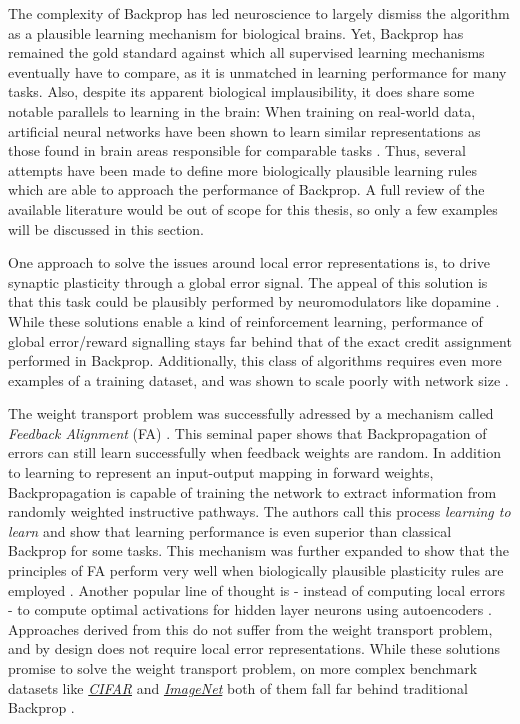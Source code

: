 The complexity of Backprop has led neuroscience to largely dismiss the algorithm as a plausible learning mechanism for
biological brains. Yet, Backprop has remained the gold standard against which all supervised learning mechanisms
eventually have to compare, as it is unmatched in learning performance for many tasks. Also, despite its apparent
biological implausibility, it does share some notable parallels to learning in the brain: When training on real-world
data, artificial neural networks have been shown to learn similar representations as those found in brain areas
responsible for comparable tasks \citep{McClelland1995,barone2000laminar,Yamins2016,Marblestone2016}. Thus, several
attempts have been made to define more biologically plausible learning rules which are able to approach the performance
of  Backprop. A full review of the available literature would be out of scope for this thesis, so only a few examples
will be discussed in this section.
\newline

One approach to solve the issues around local error representations is, to drive synaptic plasticity through a global
error signal. The appeal of this solution is that this task could be plausibly performed by neuromodulators like
dopamine \citep{Mazzoni1991,Seung2003,izhikevich2007solving}. While these solutions enable a kind of reinforcement
learning, performance of global error/reward signalling stays far behind that of the exact credit assignment performed
in Backprop. Additionally, this class of algorithms requires even more examples of a training dataset, and was shown to
scale poorly with network size \citep{Werfel2003}.
\newline


The weight transport problem was successfully adressed by a mechanism called \textit{Feedback Alignment} (FA)
\citep{Lillicrap2014}. This seminal paper shows that Backpropagation of errors can still learn successfully when
feedback weights are random. In addition to learning to represent an input-output mapping in forward weights,
Backpropagation is capable of training the network to extract information from randomly weighted instructive pathways.
The authors call this process \textit{learning to learn} and show that learning performance is even superior than
classical Backprop for some tasks. This mechanism was further expanded to show that the principles of FA perform very
well when biologically plausible plasticity rules are employed \citep{Liao2016,Zenke2018}. Another popular line of
thought is - instead of computing local errors - to compute optimal activations for hidden layer neurons using
autoencoders \citep{Bengio2014,Lee2015,Ahmad2020}. Approaches derived from this do not suffer from the weight transport
problem, and by design does not require local error representations. While these solutions promise to solve the weight
transport problem, on more complex benchmark datasets like
\textit{\href{https://www.cs.toronto.edu/~kriz/cifar.html}{CIFAR}} and
\textit{\href{https://www.image-net.org/index.php}{ImageNet}} both of them fall far behind traditional Backprop
\citep{Bartunov2018}. \newline

